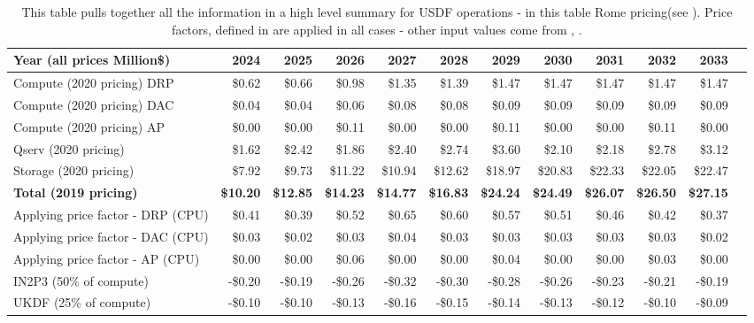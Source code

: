 \tiny \begin{longtable} { |p{}  |r  |r  |r  |r  |r  |r  |r  |r  |r  |r  |r |} 
\caption{This table pulls together all the information in a high level summary for USDF operations - in this table Rome pricing(see ). Price factors, defined in  are applied in all cases - other input values come from , .
 \label{tab:opsSumUSDF}}\\ 
\hline 
\textbf{Year  (all prices Million\$)}&\textbf{2024}&\textbf{2025}&\textbf{2026}&\textbf{2027}&\textbf{2028}&\textbf{2029}&\textbf{2030}&\textbf{2031}&\textbf{2032}&\textbf{2033} \\ \hline
{Compute (2020 pricing) DRP}&{\$0.62}&{\$0.66}&{\$0.98}&{\$1.35}&{\$1.39}&{\$1.47}&{\$1.47}&{\$1.47}&{\$1.47}&{\$1.47} \\ \hline
{Compute (2020 pricing) DAC}&{\$0.04}&{\$0.04}&{\$0.06}&{\$0.08}&{\$0.08}&{\$0.09}&{\$0.09}&{\$0.09}&{\$0.09}&{\$0.09} \\ \hline
{Compute (2020 pricing) AP}&{\$0.00}&{\$0.00}&{\$0.11}&{\$0.00}&{\$0.00}&{\$0.11}&{\$0.00}&{\$0.00}&{\$0.11}&{\$0.00} \\ \hline
{Qserv (2020 pricing)}&{\$1.62}&{\$2.42}&{\$1.86}&{\$2.40}&{\$2.74}&{\$3.60}&{\$2.10}&{\$2.18}&{\$2.78}&{\$3.12} \\ \hline
{Storage (2020 pricing)}&{\$7.92}&{\$9.73}&{\$11.22}&{\$10.94}&{\$12.62}&{\$18.97}&{\$20.83}&{\$22.33}&{\$22.05}&{\$22.47} \\ \hline
\textbf{Total (2019 pricing)}&\textbf{\$10.20}&\textbf{\$12.85}&\textbf{\$14.23}&\textbf{\$14.77}&\textbf{\$16.83}&\textbf{\$24.24}&\textbf{\$24.49}&\textbf{\$26.07}&\textbf{\$26.50}&\textbf{\$27.15} \\ \hline
{Applying price factor - DRP (CPU)}&{\$0.41}&{\$0.39}&{\$0.52}&{\$0.65}&{\$0.60}&{\$0.57}&{\$0.51}&{\$0.46}&{\$0.42}&{\$0.37} \\ \hline
{Applying price factor - DAC (CPU)}&{\$0.03}&{\$0.02}&{\$0.03}&{\$0.04}&{\$0.03}&{\$0.03}&{\$0.03}&{\$0.03}&{\$0.03}&{\$0.02} \\ \hline
{Applying price factor - AP (CPU)}&{\$0.00}&{\$0.00}&{\$0.06}&{\$0.00}&{\$0.00}&{\$0.04}&{\$0.00}&{\$0.00}&{\$0.03}&{\$0.00} \\ \hline
{IN2P3 (50\% of compute)}&{-\$0.20}&{-\$0.19}&{-\$0.26}&{-\$0.32}&{-\$0.30}&{-\$0.28}&{-\$0.26}&{-\$0.23}&{-\$0.21}&{-\$0.19} \\ \hline
{UKDF (25\% of compute)}&{-\$0.10}&{-\$0.10}&{-\$0.13}&{-\$0.16}&{-\$0.15}&{-\$0.14}&{-\$0.13}&{-\$0.12}&{-\$0.10}&{-\$0.09} \\ \hline

\end{longtable}
